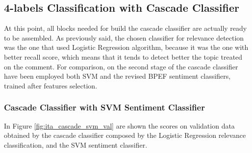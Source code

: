 \subsection{4-labels Classification with Cascade Classifier}

At this point, all blocks needed for build the cascade classifier are actually ready to be assembled. As previously said, the chosen classifier for relevance detection was the one that used Logistic Regression algorithm, because it was the one with better recall score, which means that it tends to detect better the topic treated on the comment. For comparison, on the second stage of the cascade classifier have been employed both SVM and the revised BPEF sentiment classifiers, trained after features selection.

\subsubsection{Cascade Classifier with SVM Sentiment Classifier}

In Figure \ref{fig:ita_cascade_svm_val} are shown the scores on validation data obtained by the cascade classifier composed by the Logistic Regression relevance classification, and the SVM sentiment classifier.

